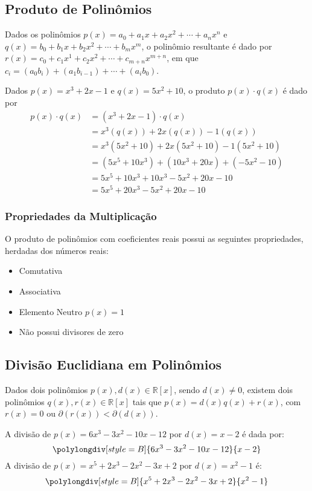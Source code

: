 \subsection{Produto de Polinômios}
Dados os polinômios $p(x)=a_0+a_1x+a_2x^2+\cdots+a_nx^n$ e $q(x)=b_0+b_1x+b_2x^2+\cdots+b_mx^m$, o polinômio resultante é dado por $r(x)=c_0+c_1x^1+c_2x^2+\cdots+c_{m+n}x^{m+n}$, em que $c_i=(a_0b_i)+(a_1b_{i-1})+\cdots+(a_ib_0)$.
\begin{exemplo}
Dados $p(x)=x^3+2x-1$ e $q(x)=5x^2+10$, o produto $p(x)\cdot q(x)$ é dado por
\begin{align*}
p(x)\cdot q(x) &=(x^3+2x-1)\cdot q(x) \\
&=x^3(q(x))+2x(q(x))-1(q(x)) \\
&=x^3(5x^2+10)+2x(5x^2+10)-1(5x^2+10) \\
&=(5x^5+10x^3)+(10x^3+20x)+(-5x^2-10) \\
&=5x^5+10x^3+10x^3-5x^2+20x-10 \\
&=5x^5 + 20x^3 -5x^2 +20x -10
\end{align*}
\end{exemplo}
\subsubsection{Propriedades da Multiplicação}
O produto de polinômios com coeficientes reais possui as seguintes propriedades, herdadas dos números reais:
\begin{itemize}
\item Comutativa
\item Associativa
\item Elemento Neutro $p(x)=1$
\item Não possui divisores de zero
\end{itemize}

\subsection{Divisão Euclidiana em Polinômios}
Dados dois polinômios $p(x), d(x) \in \mathbb{R}[x]$, sendo $d(x) \neq 0$, existem dois polinômios $q(x), r(x) \in \mathbb{R}[x]$ tais que $p(x)=d(x)q(x)+r(x)$, com $r(x)=0$ ou  $\partial(r(x)) < \partial(d(x))$.
\begin{exemplo} A divisão de $p(x)=6x^3-3x^2-10x-12$ por $d(x)=x-2$ é dada por:
\[\polylongdiv[style=B]{6x^3-3x^2-10x-12}{x-2}\]
A divisão de $p(x)=x^5+2x^3-2x^2-3x+2$ por $d(x)=x^2-1$ é:
\[\polylongdiv[style=B]{x^5+2x^3-2x^2-3x+2}{x^2-1}\]
\end{exemplo}
